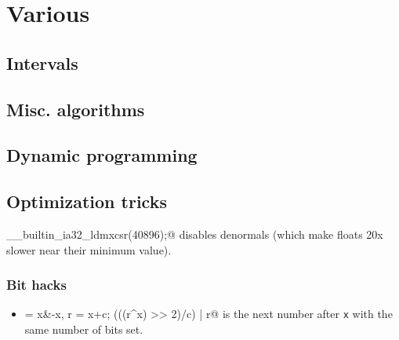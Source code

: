 \chapter{Various}

\section{Intervals}

\section{Misc. algorithms}

\section{Dynamic programming}


\section{Optimization tricks}
	\verb@__builtin_ia32_ldmxcsr(40896);@ disables denormals (which make floats 20x slower near their minimum value).
	\subsection{Bit hacks}
		\begin{itemize}
			\item \verb@c = x&-x, r = x+c; (((r^x) >> 2)/c) | r@ is the next number after \texttt{x} with the same number of bits set.
		\end{itemize}
